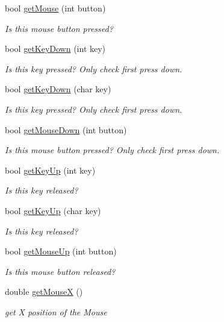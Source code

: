 \begin{DoxyCompactItemize}
bool \hyperlink{class_input_a3e7ca67c5c02f7e6516013c987339d05}{get\+Mouse} (int button)
\begin{DoxyCompactList}\small\item\em Is this mouse button pressed? \end{DoxyCompactList}\item 
bool \hyperlink{class_input_a96d176060e37d81a0f0c4fef52083b92}{get\+Key\+Down} (int key)
\begin{DoxyCompactList}\small\item\em Is this key pressed? Only check first press down. \end{DoxyCompactList}\item 
bool \hyperlink{class_input_a17110267d046bf4ec55f58b2e3f271f2}{get\+Key\+Down} (char key)
\begin{DoxyCompactList}\small\item\em Is this key pressed? Only check first press down. \end{DoxyCompactList}\item 
bool \hyperlink{class_input_aac8e9e5714c33bc9d3e478e2472fdc10}{get\+Mouse\+Down} (int button)
\begin{DoxyCompactList}\small\item\em Is this mouse button pressed? Only check first press down. \end{DoxyCompactList}\item 
bool \hyperlink{class_input_a965184281347f881d145aac555b727d7}{get\+Key\+Up} (int key)
\begin{DoxyCompactList}\small\item\em Is this key released? \end{DoxyCompactList}\item 
bool \hyperlink{class_input_a4e75aadc94c3d0fb2b236388b5dddec7}{get\+Key\+Up} (char key)
\begin{DoxyCompactList}\small\item\em Is this key released? \end{DoxyCompactList}\item 
bool \hyperlink{class_input_ad5c2b0983d6319b90ccbe1103f962736}{get\+Mouse\+Up} (int button)
\begin{DoxyCompactList}\small\item\em Is this mouse button released? \end{DoxyCompactList}\item 
double \hyperlink{class_input_a998ef567ed9101db034b8274b2543e1b}{get\+MouseX} ()
\begin{DoxyCompactList}\small\item\em get X position of the Mouse \end{DoxyCompactList}\item 

\end{DoxyCompactItemize}
